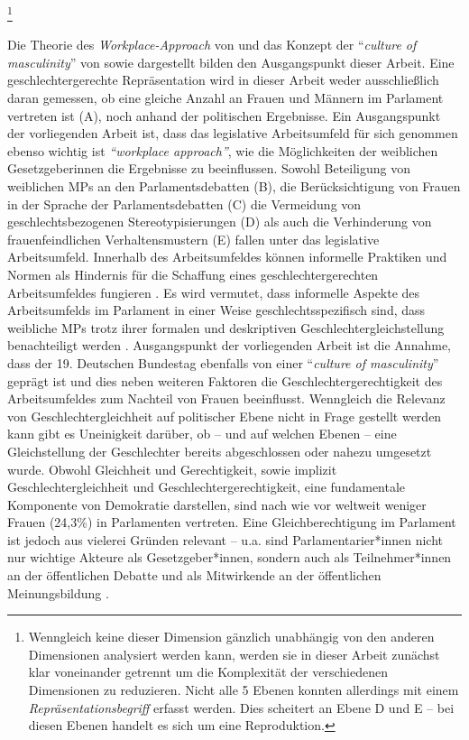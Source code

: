 \documentclass[12pt, 
    twoside=false, 
    bibliography=totoc, 
    numbers=endperiod, 
    headings=normal, 
    toc=chapterentrydotfill
    ]{scrbook}
\begin{document}
\footnote{Wenngleich keine dieser Dimension gänzlich unabhängig von den anderen Dimensionen analysiert werden kann, werden sie in dieser Arbeit zunächst klar voneinander getrennt um die Komplexität der verschiedenen Dimensionen zu reduzieren. Nicht alle 5 Ebenen konnten allerdings mit einem \emph{Repräsentationsbegriff} erfasst werden. Dies scheitert an Ebene D und E -- bei diesen Ebenen handelt es sich um eine Reproduktion.} 

Die Theorie des \emph{Workplace-Approach} von \textcite{erikson_2018} und das Konzept der \enquote{\emph{culture of masculinity}} von \textcite{lovenduski_2005} sowie \textcite{erikson_2018} dargestellt bilden den Ausgangspunkt dieser Arbeit. Eine geschlechtergerechte Repräsentation wird in dieser Arbeit weder ausschließlich daran gemessen, ob eine gleiche Anzahl an Frauen und Männern im Parlament vertreten ist (A), noch anhand der politischen Ergebnisse. Ein Ausgangspunkt der vorliegenden Arbeit ist, dass das legislative Arbeitsumfeld für sich genommen ebenso wichtig ist \emph{\enquote{workplace approach}}, wie die Möglichkeiten der weiblichen Gesetzgeberinnen die Ergebnisse zu beeinflussen. Sowohl Beteiligung von weiblichen MPs an den Parlamentsdebatten (B), die Berücksichtigung von Frauen in der Sprache der Parlamentsdebatten (C) die Vermeidung von geschlechtsbezogenen Stereotypisierungen (D) als auch die Verhinderung von frauenfeindlichen Verhaltensmustern (E) fallen unter das legislative Arbeitsumfeld. 
Innerhalb des Arbeitsumfeldes können informelle Praktiken und Normen als Hindernis für die Schaffung eines geschlechtergerechten Arbeitsumfeldes fungieren \parencite[200]{erikson_2018}. Es wird vermutet, dass informelle Aspekte des Arbeitsumfelds im Parlament in einer Weise geschlechtsspezifisch sind, dass weibliche MPs trotz ihrer formalen und deskriptiven Geschlechtergleichstellung benachteiligt werden \parencite[210]{erikson_2018}. Ausgangspunkt der vorliegenden Arbeit ist die Annahme, dass der 19. Deutschen Bundestag ebenfalls von einer \enquote{\emph{culture of masculinity}} geprägt ist und dies neben weiteren Faktoren die Geschlechtergerechtigkeit des Arbeitsumfeldes zum Nachteil von Frauen beeinflusst.
Wenngleich die Relevanz von Geschlechtergleichheit auf politischer Ebene nicht in Frage gestellt werden kann gibt es Uneinigkeit darüber, ob -- und auf welchen Ebenen -- eine  Gleichstellung der Geschlechter bereits abgeschlossen oder nahezu umgesetzt wurde.
Obwohl Gleichheit und Gerechtigkeit, sowie implizit Geschlechtergleichheit und Geschlechtergerechtigkeit, eine fundamentale Komponente von Demokratie darstellen, sind nach wie vor weltweit weniger Frauen (24,3\%) \parencite[]{ipu_2019} in Parlamenten vertreten. Eine Gleichberechtigung im Parlament ist jedoch aus vielerei Gründen relevant -- u.a. sind Parlamentarier*innen nicht nur wichtige Akteure als Gesetzgeber*innen, sondern auch als Teilnehmer*innen an der öffentlichen Debatte und als Mitwirkende an der öffentlichen Meinungsbildung \parencite[188]{dahlerup_2018}.
\end{document}
